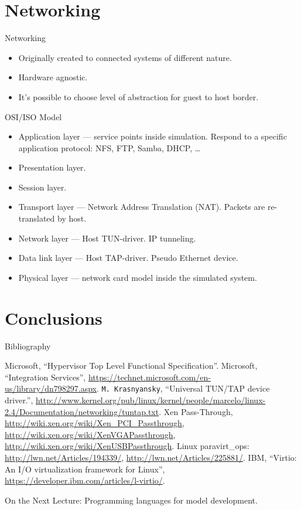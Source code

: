 \section{Networking}

\begin{frame}{Networking}
  \begin{itemize}
    \item Originally created to connected systems of different nature.
    \item Hardware agnostic.
    \item It's possible to choose level of abstraction for guest to host
      border.
  \end{itemize}
\end{frame}

\begin{frame}{OSI/ISO Model}
  \begin{itemize}
    \item Application layer --- service points inside simulation. Respond to a
      specific application protocol: NFS, FTP, Samba, DHCP, \dots
    \item Presentation layer.
    \item Session layer.
    \item Transport layer --- Network Address Translation (NAT). Packets are
      re-translated by host.
    \item Network layer --- Host TUN-driver. IP tunneling.
    \item Data link layer --- Host TAP-driver. Pseudo Ethernet device.
    \item Physical layer --- network card model inside the simulated system.
  \end{itemize}
\end{frame}

\section*{Conclusions}

\begin{frame}[allowframebreaks]{Bibliography}
  \begin{thebibliography}{99}
    \bibitem{} Microsoft, ``Hypervisor Top Level Functional Specification''.
    \bibitem{} Microsoft, ``Integration Services'',
      \url{https://technet.microsoft.com/en-us/library/dn798297.aspx}.
    \bibitem{} \texttt{M.~Krasnyansky}, ``Universal TUN/TAP device driver.'',
      \url{http://www.kernel.org/pub/linux/kernel/people/marcelo/linux-2.4/Documentation/networking/tuntap.txt}.
    \bibitem{} Xen Pass-Through, \url{http://wiki.xen.org/wiki/Xen_PCI_Passthrough},
      \url{http://wiki.xen.org/wiki/XenVGAPassthrough},
      \url{http://wiki.xen.org/wiki/XenUSBPassthrough}.
    \bibitem{} Linux paravirt\_ops: \url{http://lwn.net/Articles/194339/},
      \url{http://lwn.net/Articles/225881/}.
    \bibitem{} IBM, ``Virtio: An I/O virtualization framework for Linux'',
      \url{https://developer.ibm.com/articles/l-virtio/}.
  \end{thebibliography}
\end{frame}

\begin{frame}{On the Next Lecture:}
  Programming languages for model development.
\end{frame}

\finalslide


